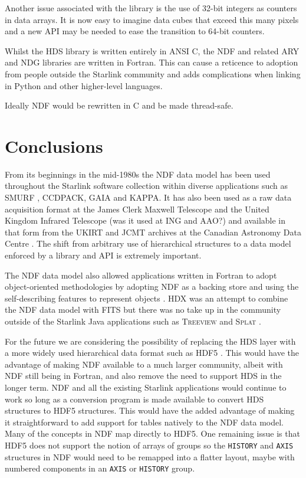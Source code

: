 \documentclass[final,authoryear,5p,times,twocolumn]{elsarticle}
\begin{document}
Another issue associated with the library is the use of 32-bit
integers as counters in data arrays. It is now easy to imagine data
cubes that exceed this many pixels and a new API may be needed to ease
the transition to 64-bit counters.

Whilst the HDS library is written entirely in ANSI C, the NDF and
related ARY \citep{SUN11} and NDG \citep{SUN2} libraries are written in Fortran.
This can cause a reticence to adoption from people outside the Starlink community and
adds complications when linking in Python and other higher-level
languages.

Ideally NDF would be rewritten in C and be made thread-safe.

\section{Conclusions}

From its beginnings in the mid-1980s the NDF data model has been used
throughout the Starlink software collection within diverse
applications such as SMURF \citep{2013MNRAS.430.2545C}, CCDPACK, GAIA
and KAPPA. It has also been used as a raw data acquisition format at the
James Clerk Maxwell Telescope and the United Kingdom Infrared
Telescope {\color{red} (was it used at ING and AAO?)} and available in that form
from the UKIRT and JCMT archives at the Canadian Astronomy Data Centre
\citep{2008ASPC..394..450E,P01_adassxxiii}. The shift from arbitrary
use of hierarchical structures to a data model enforced by a library
and API is extremely important.

The NDF data model also allowed applications written in Fortran to
adopt object-oriented methodologies by adopting NDF as a backing store
and using the self-describing features to represent objects
\citep{1993ASPC...52..199B}. HDX was an attempt to combine
the NDF data model with FITS \citep{2003ASPC..295..221G} but there was
no take up in the community outside of the Starlink Java applications
such as \textsc{Treeview} \citep{2003ASPC..295..445B} and
\textsc{Splat} \citep[][ascl:1402.007]{2005ASPC..347...22D}.

For the future we are considering the possibility of replacing the HDS
layer with a more widely used hierarchical data format such as HDF5
\citep{Folk:2011:OHT:1966895.1966900}. This would have the advantage
of making NDF available to a much larger community, albeit with NDF
still being in Fortran, and also remove the
need to support HDS in the longer term. NDF and all the existing
Starlink applications would continue to work so long as a conversion
program is made available to convert HDS structures to HDF5 structures.
This would have the added advantage of making it straightforward to
add support for tables natively to the NDF data model. Many of the
concepts in NDF map directly to HDF5. One remaining issue is that HDF5
does not support the notion of arrays of groups so the
\texttt{HISTORY} and \texttt{AXIS} structures in NDF would need to be
remapped into a flatter layout, maybe with numbered components in an
\texttt{AXIS} or \texttt{HISTORY} group.
\end{document}
